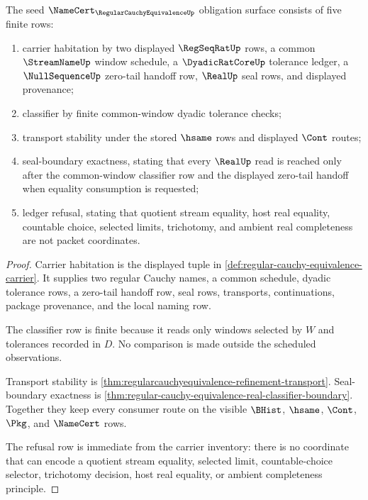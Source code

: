 \begin{theorem}
\label{thm:regular-cauchy-equivalence-namecert-obligations}
The seed $\NameCert_{\RegularCauchyEquivalenceUp}$ obligation surface consists of five finite rows:
\begin{enumerate}
\item carrier habitation by two displayed $\RegSeqRatUp$ rows, a common $\StreamNameUp$ window schedule, a $\DyadicRatCoreUp$ tolerance ledger, a $\NullSequenceUp$ zero-tail handoff row, $\RealUp$ seal rows, and displayed provenance;
\item classifier by finite common-window dyadic tolerance checks;
\item transport stability under the stored $\hsame$ rows and displayed $\Cont$ routes;
\item seal-boundary exactness, stating that every $\RealUp$ read is reached only after the common-window classifier row and the displayed zero-tail handoff when equality consumption is requested;
\item ledger refusal, stating that quotient stream equality, host real equality, countable choice, selected limits, trichotomy, and ambient real completeness are not packet coordinates.
\end{enumerate}
\end{theorem}
\begin{proof}
Carrier habitation is the displayed tuple in \autoref{def:regular-cauchy-equivalence-carrier}. It supplies two regular Cauchy names, a common schedule, dyadic tolerance rows, a zero-tail handoff row, seal rows, transports, continuations, package provenance, and the local naming row.

The classifier row is finite because it reads only windows selected by $W$ and tolerances recorded in $D$. No comparison is made outside the scheduled observations.

Transport stability is \autoref{thm:regularcauchyequivalence-refinement-transport}. Seal-boundary exactness is \autoref{thm:regular-cauchy-equivalence-real-classifier-boundary}. Together they keep every consumer route on the visible $\BHist$, $\hsame$, $\Cont$, $\Pkg$, and $\NameCert$ rows.

The refusal row is immediate from the carrier inventory: there is no coordinate that can encode a quotient stream equality, selected limit, countable-choice selector, trichotomy decision, host real equality, or ambient completeness principle.
\end{proof}

